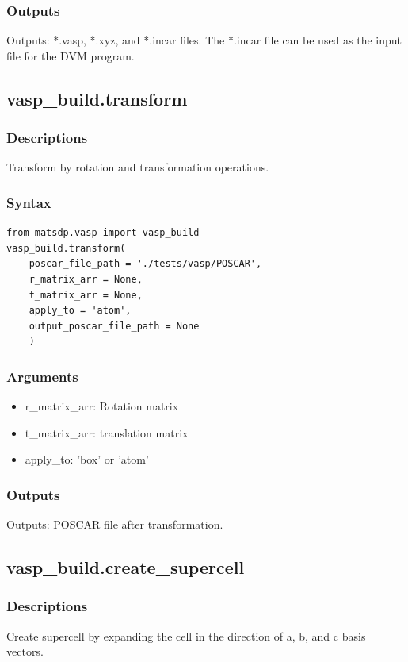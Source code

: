 \documentclass[12pt]{book}
\begin{document}
\subsubsection{Outputs}
Outputs: *.vasp, *.xyz, and *.incar files. The *.incar file can be used as the input file for the DVM program.


\subsection{vasp\_build.transform}
\subsubsection{Descriptions}
 Transform by rotation and transformation operations.
\subsubsection{Syntax}
\begin{lstlisting}
from matsdp.vasp import vasp_build
vasp_build.transform(
    poscar_file_path = './tests/vasp/POSCAR', 
    r_matrix_arr = None, 
    t_matrix_arr = None, 
    apply_to = 'atom', 
    output_poscar_file_path = None
    )
\end{lstlisting}

\subsubsection{Arguments}
\begin{itemize}
\item r\_matrix\_arr: Rotation matrix
\item t\_matrix\_arr: translation matrix
\item apply\_to: 'box' or 'atom'
\end{itemize}

\subsubsection{Outputs}
Outputs: POSCAR file after transformation.





\subsection{vasp\_build.create\_supercell}
\subsubsection{Descriptions}
Create supercell by expanding the cell in the direction of a, b, and c basis vectors.
\end{document}

